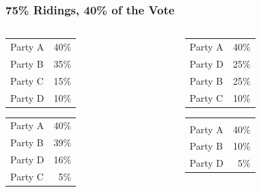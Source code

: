 \documentclass[14pt,t,hyperref={colorlinks=true,urlcolor=red}]{beamer}
\begin{document}
\begin{frame} %
\frametitle{75\% Ridings, 40\% of the Vote}

\begin{columns} 

\begin{column}{0.45\textwidth} %

\begin{block}{}
\begin{center}
\begin{tabular} {lr}
\alert{Party A} & \alert{40\%} \\
Party B  & 35\% \\
Party C  & 15\% \\
Party D  & 10\% \\
\end{tabular}
\end{center}
\end{block}

\begin{block}{}
\begin{center}
\begin{tabular} {lr}
\alert{Party A} & \alert{40\%} \\
Party B  & 39\% \\
Party D  & 16\% \\
Party C  &  5\% \\
\end{tabular}
\end{center}
\end{block}

\end{column} %

\begin{column}{0.45\textwidth} %

\begin{block}{}
\begin{center}
\begin{tabular} {lr}
\alert{Party A} & \alert{40\%} \\
Party D  & 25\% \\
Party B  & 25\% \\
Party C  & 10\% \\
\end{tabular}
\end{center}
\end{block}

\begin{block}{}
\begin{center}
\begin{tabular} {lr}
\color{orange}{Party C} & \color{orange}{45\%} \\
\alert{Party A}  & \alert{40\%} \\
Party B  & 10\% \\
Party D  &  5\% \\
\end{tabular}
\end{center}
\end{block}


\end{column}
\end{columns}
\end{frame}
\end{document}
